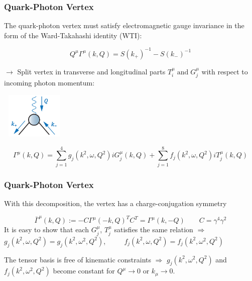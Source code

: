 \begin{frame}\frametitle{Quark-Photon Vertex}

The quark-photon vertex must satisfy electromagnetic gauge invariance in the form of the
Ward-Takahashi identity (WTI):

\begin{equation}
	Q^\mu\Gamma^\mu(k, Q)=S(k_+)^{-1}-S(k_-)^{-1}
\end{equation}

\begin{minipage}[r]{0.65\textwidth}
	$\rightarrow$ Split vertex in transverse and longitudinal parts $T_i^{\mu} \; \text{and} \; G_j^{\mu} $ with respect to incoming photon momentum:
\end{minipage}
\begin{minipage}[r]{0.30\textwidth}
	\hspace{2mm}
	\includegraphics[height=2.2cm, width=3.2cm]{Vertex.png}
\end{minipage}

\begin{equation}
	\Gamma^\mu(k,Q)=\sum_{j=1}^4 g_j(k^2, \omega, Q^2)iG^\mu_j(k, Q)+\sum_{j=1}^8 f_j(k^2, \omega, Q^2)iT^\mu_j(k, Q)
\end{equation}

\end{frame}

\begin{frame}\frametitle{Quark-Photon Vertex}
With this decomposition, the vertex has a charge-conjugation symmetry

\begin{equation}
	\bar{\Gamma}^\mu(k,Q):=-C\Gamma^\mu(-k,Q)^TC^T=\Gamma^\mu(k, -Q) \qquad C=\gamma^4\gamma^2
\end{equation}
\vspace{4mm}
It is easy to show that each $G_j^\mu$, $T_j^\mu$
satisfies the same relation $\Rightarrow$\\ \vspace{3mm} $g_j(k^2, \omega, Q^2)=g_j(k^2, \omega^2, Q^2)$, $\qquad$ $f_j(k^2, \omega, Q^2)=f_j(k^2, \omega^2, Q^2)$\\

\vspace{9mm}

The tensor basis  is free of kinematic constraints $\Rightarrow$
\vspace{2mm}
$g_j(k^2, \omega^2,Q^2)$ and $f_j(k^2, \omega^2,Q^2)$ become constant for $Q^\mu\to0$ or $k_\mu\to  0$.

\end{frame}


\endinput

